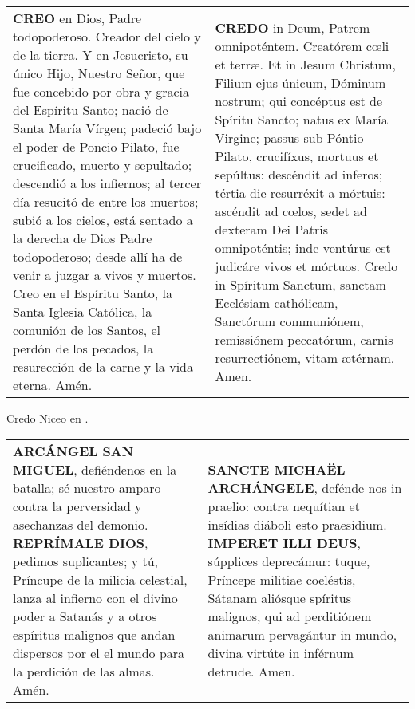 \documentclass[./rosary.tex]{subfiles}
\begin{document}
\label{creed}
\begin{longtable} { p{} p{} }
    \textbf{CREO} en Dios, Padre todopoderoso. Creador del cielo y de la tierra. Y en Jesucristo, su único Hijo, Nuestro Señor,
    que fue concebido por obra y gracia del Espíritu Santo; nació de Santa María Vírgen; padeció bajo el poder de Poncio Pilato,
    fue crucificado, muerto y sepultado; descendió a los infiernos; al tercer día resucitó de entre los muertos; subió a los cielos,
    está sentado a la derecha de Dios Padre todopoderoso; desde allí ha de venir a juzgar a vivos y muertos.
    Creo en el Espíritu Santo, la Santa Iglesia Católica, la comunión de los Santos, el perdón de los pecados,
    la resurección de la carne y la vida eterna. Amén.
    
     &

    \textbf{CREDO} in Deum, Patrem omnipoténtem. Creatórem cœli et terræ. Et in Jesum Christum, Filium ejus únicum, Dóminum nostrum;
    qui concéptus est de Spíritu Sancto; natus ex María Virgine; passus sub Póntio Pilato, crucifíxus, mortuus et sepúltus:
    descéndit ad inferos; tértia die resurréxit a mórtuis: ascéndit ad cœlos, sedet ad dexteram Dei Patris omnipoténtis;
    inde ventúrus est judicáre vivos et mórtuos. Credo in Spíritum Sanctum, sanctam Ecclésiam cathólicam, Sanctórum communiónem,
    remissiónem peccatórum, carnis resurrectiónem, vitam ætérnam. Amen.
\end{longtable}
\smallskip
Credo Niceo en .
\smallskip

\begin{longtable} { p{} p{} }
    \textbf{ARCÁNGEL SAN MIGUEL}, defiéndenos en la batalla; sé nuestro amparo contra la perversidad y asechanzas del demonio. \textbf{REPRÍMALE DIOS}, pedimos
    suplicantes; y tú, Príncupe de la milicia celestial, lanza al infierno con el divino poder a Satanás y a otros espíritus malignos que andan dispersos por el
    el mundo para la perdición de las almas. Amén.
    
     &

    \textbf{SANCTE MICHAËL ARCHÁNGELE}, defénde nos in praelio: contra nequítian et insídias diáboli esto praesidium. \textbf{IMPERET ILLI DEUS}, 
    súpplices deprecámur: tuque, Prínceps militiae coeléstis, Sátanam aliósque spíritus malignos, qui ad perditiónem animarum pervagántur in mundo,
    divina virtúte in inférnum detrude. Amen.
\end{longtable}
\end{document}

